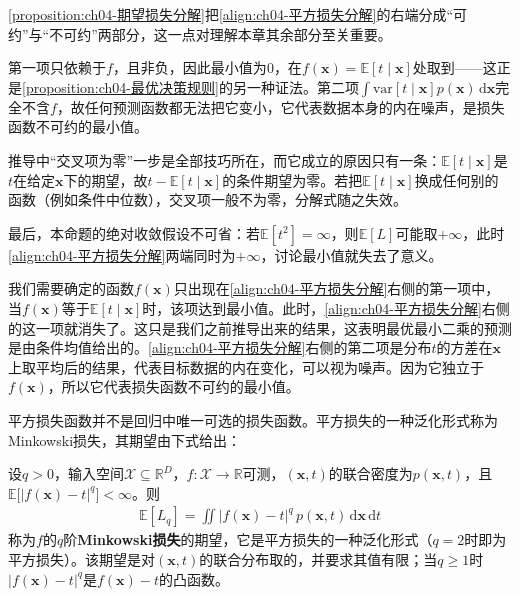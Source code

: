\documentclass[../../main.tex]{subfiles}
\begin{document}
\begin{remark}
\cref{proposition:ch04-期望损失分解}把\eqref{align:ch04-平方损失分解}的右端分成“可约”与“不可约”两部分，这一点对理解本章其余部分至关重要。

第一项只依赖于$f$，且非负，因此最小值为$0$，在$f(\boldsymbol{x})=\mathbb{E}[t\mid\boldsymbol{x}]$处取到——这正是\cref{proposition:ch04-最优决策规则}的另一种证法。第二项$\int\mathrm{var}[t\mid\boldsymbol{x}]p(\boldsymbol{x})\,\mathrm{d}\boldsymbol{x}$完全不含$f$，故任何预测函数都无法把它变小，它代表数据本身的内在噪声，是损失函数不可约的最小值。

推导中“交叉项为零”一步是全部技巧所在，而它成立的原因只有一条：$\mathbb{E}[t\mid\boldsymbol{x}]$是$t$在给定$\boldsymbol{x}$下的期望，故$t-\mathbb{E}[t\mid\boldsymbol{x}]$的条件期望为零。若把$\mathbb{E}[t\mid\boldsymbol{x}]$换成任何别的函数（例如条件中位数），交叉项一般不为零，分解式随之失效。

最后，本命题的绝对收敛假设不可省：若$\mathbb{E}[t^2]=\infty$，则$\mathbb{E}[L]$可能取$+\infty$，此时\eqref{align:ch04-平方损失分解}两端同时为$+\infty$，讨论最小值就失去了意义。
\end{remark}

我们需要确定的函数$f(\boldsymbol{x})$只出现在\eqref{align:ch04-平方损失分解}右侧的第一项中，当$f(\boldsymbol{x})$等于$\mathbb{E}[t\mid\boldsymbol{x}]$时，该项达到最小值。此时，\eqref{align:ch04-平方损失分解}右侧的这一项就消失了。这只是我们之前推导出来的结果，这表明最优最小二乘的预测是由条件均值给出的。\eqref{align:ch04-平方损失分解}右侧的第二项是分布$t$的方差在$\boldsymbol{x}$上取平均后的结果，代表目标数据的内在变化，可以视为噪声。因为它独立于$f(\boldsymbol{x})$，所以它代表损失函数不可约的最小值。

平方损失函数并不是回归中唯一可选的损失函数。平方损失的一种泛化形式称为Minkowski损失，其期望由下式给出：

\begin{definition}[Minkowski损失]\label{definition:ch04-Minkowski损失}
设$q>0$，输入空间$\mathcal{X}\subseteq\mathbb{R}^{D}$，$f:\mathcal{X}\to\mathbb{R}$可测，$(\boldsymbol{x},t)$的联合密度为$p(\boldsymbol{x},t)$，且$\mathbb{E}\bigl[|f(\boldsymbol{x})-t|^{q}\bigr]<\infty$。则
\begin{align}
  \mathbb{E}[L_q]=\iint|f(\boldsymbol{x})-t|^q\,p(\boldsymbol{x},t)\,\mathrm{d}\boldsymbol{x}\,\mathrm{d}t
  \label{align:ch04-Minkowski损失}
\end{align}
称为$f$的$q$阶\textbf{Minkowski损失}的期望，它是平方损失的一种泛化形式（$q=2$时即为平方损失）。该期望是对$(\boldsymbol{x},t)$的联合分布取的，并要求其值有限；当$q\geqslant1$时$|f(\boldsymbol{x})-t|^{q}$是$f(\boldsymbol{x})-t$的凸函数。
\end{definition}
\end{document}
